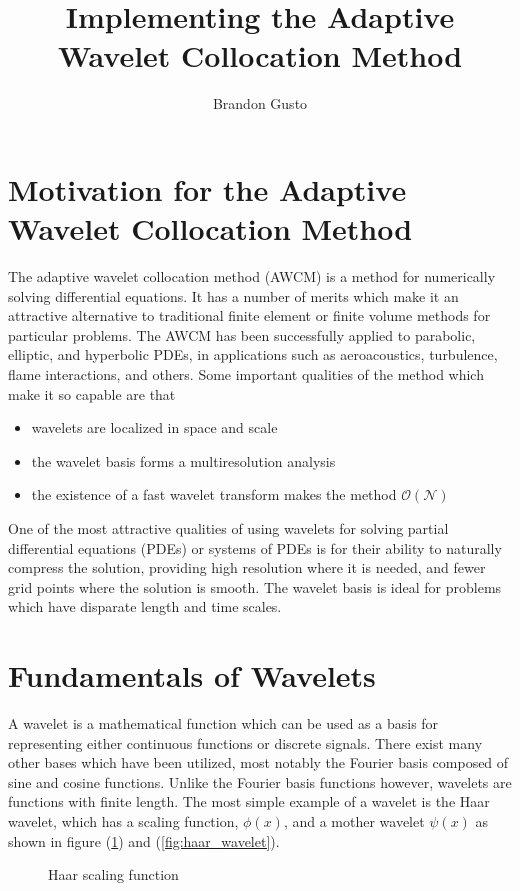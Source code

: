 \documentclass[11pt]{article}
\begin{document}
\title{Implementing the Adaptive Wavelet Collocation Method}
\author{Brandon Gusto \\}

\maketitle
%
\section{Motivation for the Adaptive Wavelet Collocation Method}
The adaptive wavelet collocation method (AWCM) is a method for numerically solving differential equations.
It has a number of merits which make it an attractive alternative to traditional finite element or finite volume 
methods for particular problems. The AWCM has been successfully applied to parabolic, elliptic, and 
hyperbolic PDEs, in applications such as aeroacoustics, turbulence, flame interactions, and others. 
Some important qualities of the method which make it so capable are that
\begin{itemize}
    \item wavelets are localized in space and scale
    \item the wavelet basis forms a multiresolution analysis
    \item the existence of a fast wavelet transform makes the method $\mathcal{O}(\mathcal{N})$
\end{itemize} 
One of the most attractive qualities of using wavelets for solving partial differential equations (PDEs) or systems of PDEs is for their
ability to naturally compress the solution, providing high resolution where it is needed, and fewer grid points where the 
solution is smooth. The wavelet basis is ideal for problems which have 
disparate length and time scales.

\section{Fundamentals of Wavelets}
A wavelet is a mathematical function which can be used as a basis for representing either continuous functions or 
discrete signals. There exist many other bases which have been utilized, most notably the Fourier
basis composed of sine and cosine functions.
Unlike the Fourier basis functions however, wavelets are functions with finite length. The most simple example of a wavelet
is the Haar wavelet, which has a scaling function, $\phi(x)$, and a mother wavelet $\psi(x)$ as shown in 
figure (\ref{fig:haar_scaling}) and (\ref{fig:haar_wavelet}).
\begin{figure}[H]
	\centering
	
	\caption{Haar scaling function}
	\label{fig:haar_scaling}
\end{figure}
\end{document}
